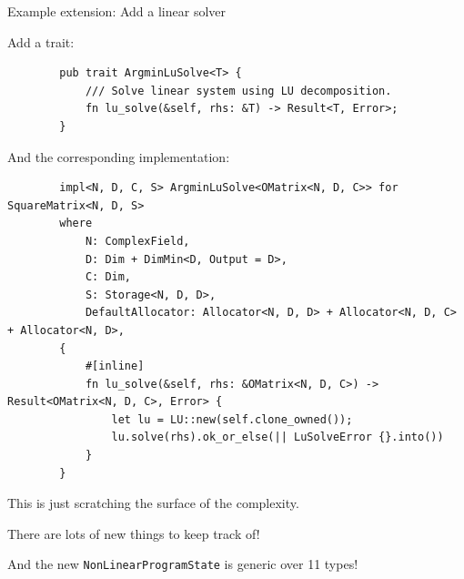 \documentclass{beamer}
\begin{document}
\begin{frame}[fragile]{Example extension: Add a linear solver}

  \scriptsize
  Add a trait:

  \begin{listing}
    \begin{verbatim}
        pub trait ArgminLuSolve<T> {
            /// Solve linear system using LU decomposition.
            fn lu_solve(&self, rhs: &T) -> Result<T, Error>;
        }
    \end{verbatim}


  \end{listing}

  And the corresponding implementation:

  \begin{listing}
    \begin{verbatim}
        impl<N, D, C, S> ArgminLuSolve<OMatrix<N, D, C>> for SquareMatrix<N, D, S>
        where
            N: ComplexField,
            D: Dim + DimMin<D, Output = D>,
            C: Dim,
            S: Storage<N, D, D>,
            DefaultAllocator: Allocator<N, D, D> + Allocator<N, D, C> + Allocator<N, D>,
        {
            #[inline]
            fn lu_solve(&self, rhs: &OMatrix<N, D, C>) -> Result<OMatrix<N, D, C>, Error> {
                let lu = LU::new(self.clone_owned());
                lu.solve(rhs).ok_or_else(|| LuSolveError {}.into())
            }
        }
    \end{verbatim}
  \end{listing}


  This is just scratching the surface of the complexity.

  There are lots of new things to keep track of!

  And the new \texttt{NonLinearProgramState} is generic over 11 types!

\end{frame}
\end{document}
